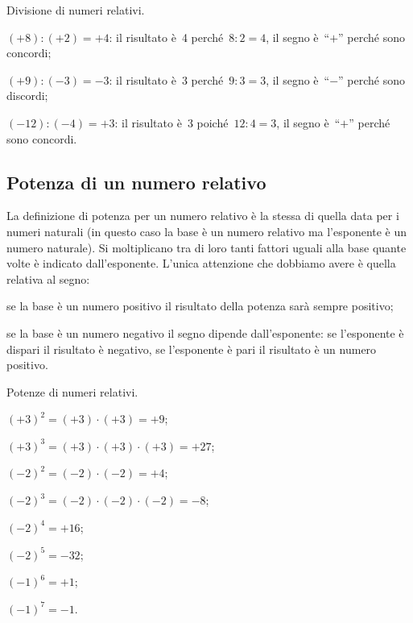 \begin{exrig}
 \begin{esempio} Divisione di numeri relativi.
  \begin{itemize*}
  \item $(+8):(+2)=+4$: il risultato è~4 perché~$8:2=4$, il segno è~``$+$'' perché sono concordi;
  \item $(+9):(-3)=-3$: il risultato è~3 perché~$9:3=3$, il segno è~``$-$'' perché sono discordi;
  \item $(-12):(-4)=+3$: il risultato è~3 poiché~$12:4=3$, il segno è~``$+$'' perché sono concordi.
  \end{itemize*}
 \end{esempio}
\end{exrig}

\ovalbox{\risolvii \ref{ese:2.19}, \ref{ese:2.20}, \ref{ese:2.21}}

\subsection{Potenza di un numero relativo}

La definizione di potenza per un numero relativo è la stessa di quella data per i numeri naturali
(in questo caso la base è un numero relativo ma l'esponente è un numero naturale).
Si moltiplicano tra di loro tanti fattori uguali alla base quante volte è indicato dall'esponente.
L'unica attenzione che dobbiamo avere è quella relativa al segno:
 \begin{itemize*}
 \item se la base è un numero positivo il risultato della potenza sarà sempre positivo;
 \item se la base è un numero negativo il segno dipende dall'esponente: se l'esponente è dispari il
risultato è negativo, se l'esponente è pari il risultato è un numero positivo.
 \end{itemize*}

\begin{exrig}
 \begin{esempio}
 Potenze di numeri relativi.
  \begin{multicols}{2}
 \begin{itemize*}
 \item $(+3)^2=(+3)\cdot(+3)=+9$;
 \item $(+3)^3=(+3)\cdot(+3)\cdot(+3)=+27$;
 \item $(-2)^2=(-2)\cdot(-2)=+4$;
 \item $(-2)^3=(-2)\cdot(-2)\cdot(-2)=-8$;
 \item $(-2)^4=+16$;
 \item $(-2)^5=-32$;
 \item $(-1)^6=+1$;
 \item $(-1)^7=-1$.
 \end{itemize*}
  \end{multicols}
 \end{esempio}
\end{exrig}

